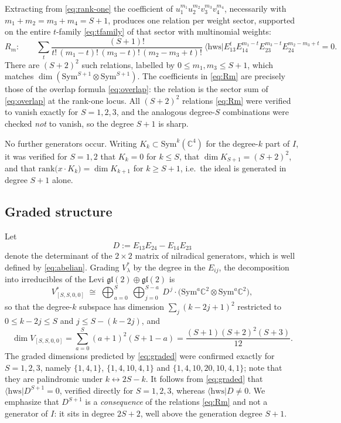 \documentclass[12pt]{article}
\newcommand{\hws}{\mathrm{hws}}
\newcommand{\gl}{\mathfrak{gl}}
\newcommand{\Sym}{\mathrm{Sym}}
\begin{document}
Extracting from \eqref{eq:rank-one} the coefficient of
$u_1^{m_1}u_2^{m_2}v_3^{m_3}v_4^{m_4}$, necessarily with
$m_1+m_2=m_3+m_4=S+1$, produces one relation per weight sector, supported on the
entire $t$-family \eqref{eq:tfamily} of that sector with multinomial weights:
\begin{equation}
R_m:\qquad
\sum_{t}\frac{(S+1)!}{t!\,(m_1-t)!\,(m_3-t)!\,(m_2-m_3+t)!}\
\langle\hws|E_{13}^{t}E_{14}^{m_1-t}E_{23}^{m_3-t}E_{24}^{m_2-m_3+t}=0 .
\label{eq:Rm}
\end{equation}
There are $(S+2)^2$ such relations, labelled by $0\leq m_1,m_3\leq S+1$, which
matches $\dim(\Sym^{S+1}\otimes\Sym^{S+1})$. The coefficients in \eqref{eq:Rm}
are precisely those of the overlap formula \eqref{eq:overlap}: the relation is
the sector sum of \eqref{eq:overlap} at the rank-one locus. All $(S+2)^2$
relations \eqref{eq:Rm} were verified to vanish exactly for $S=1,2,3$, and the
analogous degree-$S$ combinations were checked \emph{not} to vanish, so the
degree $S+1$ is sharp.

No further generators occur. Writing $K_k\subset\Sym^k(\mathbb{C}^4)$ for the
degree-$k$ part of $I$, it was verified for $S=1,2$ that $K_k=0$ for $k\leq S$,
that $\dim K_{S+1}=(S+2)^2$, and that
$\mathrm{rank}\big(x\cdot K_k\big)=\dim K_{k+1}$ for $k\geq S+1$, i.e.\ the ideal
is generated in degree $S+1$ alone.

\subsection{Graded structure}

Let
\begin{equation}
D:=E_{13}E_{24}-E_{14}E_{23}
\end{equation}
denote the determinant of the $2\times2$ matrix of nilradical generators, which
is well defined by \eqref{eq:abelian}. Grading $V_\lambda^*$ by the degree in the
$E_{ij}$, the decomposition into irreducibles of the Levi
$\gl(2)\oplus\gl(2)$ is
\begin{equation}
V_{[S,S,0,0]}^*\;\cong\;\bigoplus_{a=0}^{S}\ \bigoplus_{j=0}^{S-a}\
D^{\,j}\cdot\big(\Sym^a\mathbb{C}^2\otimes\Sym^a\mathbb{C}^2\big),
\label{eq:graded}
\end{equation}
so that the degree-$k$ subspace has dimension
$\sum_{j}(k-2j+1)^2$ restricted to $0\leq k-2j\leq S$ and $j\leq S-(k-2j)$, and
\begin{equation}
\dim V_{[S,S,0,0]}=\sum_{a=0}^{S}(a+1)^2(S+1-a)=\frac{(S+1)(S+2)^2(S+3)}{12}.
\label{eq:dim}
\end{equation}
The graded dimensions predicted by \eqref{eq:graded} were confirmed exactly for
$S=1,2,3$, namely $\{1,4,1\}$, $\{1,4,10,4,1\}$ and $\{1,4,10,20,10,4,1\}$; note
that they are palindromic under $k\leftrightarrow 2S-k$. It follows from
\eqref{eq:graded} that $\langle\hws|D^{S+1}=0$, verified directly for $S=1,2,3$,
whereas $\langle\hws|D\neq0$. We emphasize that $D^{S+1}$ is a
\emph{consequence} of the relations \eqref{eq:Rm} and not a generator of $I$: it
sits in degree $2S+2$, well above the generation degree $S+1$.
\end{document}
